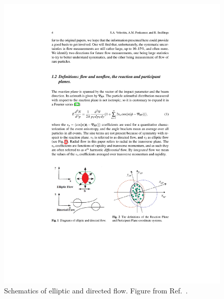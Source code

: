 \begin{figure}
\begin{center}
\begin{minipage}[b]{0.45\textwidth}
\includegraphics[width=\textwidth]{figures/theory/flow_v1_v2}
\caption{Schematics of elliptic and directed flow.
Figure from Ref.~\cite{Voloshin:2008dg}.}
\label{fig:flow_v1_v2}
  \end{minipage}
  \end{center}
\end{figure}

